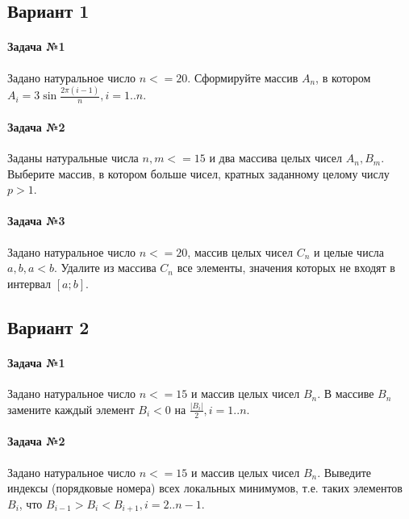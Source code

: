 \documentclass[12pt,a4paper]{report}
\begin{document}
\parindent=1cm
\pagestyle{empty}




\clearpage
\subsection*{Вариант 1}
\paragraph*{Задача №1}
Задано натуральное число $n <= 20$. Сформируйте массив $A_n$, в котором $A_i = 3 \sin {  \frac {2 \pi (i - 1)} {n} }, i = 1..n$.
\paragraph*{Задача №2}
Заданы натуральные числа $n, m <= 15$ и два массива целых чисел $A_n, B_m$. Выберите массив, в котором больше чисел, кратных заданному целому числу $p > 1$.
\paragraph*{Задача №3}
Задано натуральное число $n <= 20$, массив целых чисел $C_n$ и целые числа $a, b, a < b$. Удалите из массива $C_n$ все элементы, значения которых не входят в интервал $[a; b]$.


\subsection*{Вариант 2}
\paragraph*{Задача №1}
Задано натуральное число $n <= 15$ и массив целых чисел $B_n$. В массиве $B_n$ замените каждый элемент $B_i < 0$ на $\frac {|B_i|} {2}, i = 1..n$.
\paragraph*{Задача №2}
Задано натуральное число $n <= 15$ и массив целых чисел $B_n$. Выведите индексы (порядковые номера) всех локальных минимумов, т.е. таких элементов $B_i$, что $B_{i-1} > B_{i} < B_{i+1}, i=2..n-1$.
\end{document}
